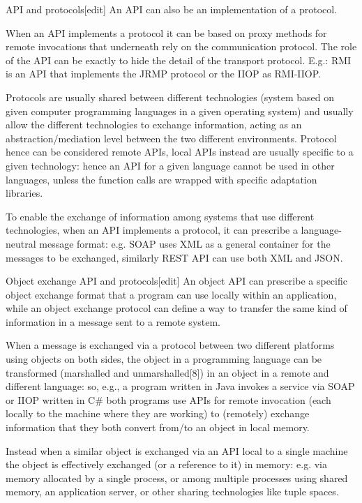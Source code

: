 API and protocols[edit]
An API can also be an implementation of a protocol.

When an API implements a protocol it can be based on proxy methods for remote invocations that underneath rely on the communication protocol. The role of the API can be exactly to hide the detail of the transport protocol.
 E.g.: RMI is an API that implements the JRMP protocol or the IIOP as RMI-IIOP.

Protocols are usually shared between different technologies (system based on given computer programming languages in a given operating system) and usually allow the different technologies to exchange information, acting as an abstraction/mediation level between the two different environments. 
Protocol hence can be considered remote APIs, local APIs instead are usually specific to a given technology: hence an API for a given language cannot be used in other languages, unless the function calls are wrapped with specific adaptation libraries.

To enable the exchange of information among systems that use different technologies, when an API implements a protocol, it can prescribe a language-neutral message format: e.g. SOAP uses XML as a general container for the messages to be exchanged, similarly REST API can use both XML and JSON.

Object exchange API and protocols[edit]
An object API can prescribe a specific object exchange format that a program can use locally within an application, while an object exchange protocol can define a way to transfer the same kind of information in a message sent to a remote system.

When a message is exchanged via a protocol between two different platforms using objects on both sides, the object in a programming language can be transformed (marshalled and unmarshalled[8]) in an object in a remote and different language: so, e.g., a program written in Java invokes a service via SOAP or IIOP written in C# both programs use APIs for remote invocation (each locally to the machine where they are working) to (remotely) exchange information that they both convert from/to an object in local memory.

Instead when a similar object is exchanged via an API local to a single machine the object is effectively exchanged (or a reference to it) in memory: e.g. via memory allocated by a single process, or among multiple processes using shared memory, an application server, or other sharing technologies like tuple spaces.


